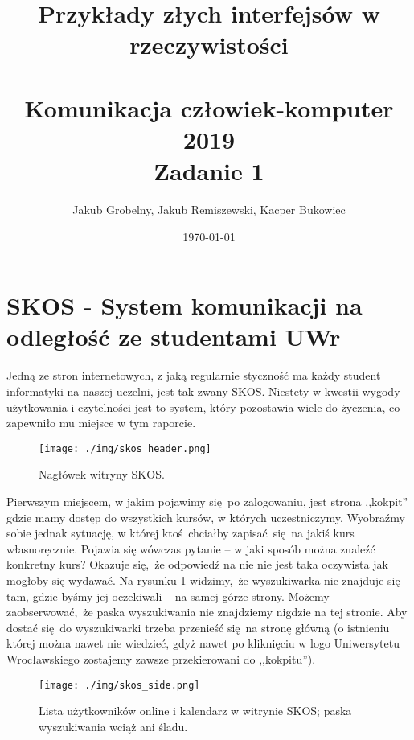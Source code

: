\documentclass[12pt, a4paper, oneside]{report}
\title{\Huge \textbf{Przykłady złych interfejsów w rzeczywistości}\\\,\\
       \Large Komunikacja człowiek-komputer 2019\\
       Zadanie 1}
\date{\today}
\author{Jakub Grobelny, Jakub Remiszewski, Kacper Bukowiec}
\begin{document}
\begin{titlepage}
    \maketitle
    \thispagestyle{empty}
\end{titlepage}

\renewcommand*\thesubsection{\arabic{section}}


\chapter*{SKOS - System komunikacji na odległość ze studentami UWr}

Jedną ze stron internetowych, z jaką regularnie styczność ma każdy student
informatyki na naszej uczelni, jest tak zwany SKOS. Niestety w kwestii wygody
użytkowania i czytelności jest to system, który pozostawia wiele do życzenia, 
co zapewniło mu miejsce w tym raporcie. \\

\begin{figure}[H]
    \centering
    \texttt{[image: ./img/skos\_header.png]}
    \caption{Nagłówek witryny SKOS.}
    \label{figure:skos-header}
\end{figure}

Pierwszym miejscem, w jakim pojawimy się po zalogowaniu, jest strona
,,kokpit'' gdzie mamy dostęp do wszystkich kursów, w których uczestniczymy.
Wyobraźmy sobie jednak sytuację, w której ktoś chciałby zapisać się na jakiś
kurs własnoręcznie. Pojawia się wówczas pytanie -- w jaki sposób można znaleźć
konkretny kurs? Okazuje się, że odpowiedź na nie nie jest taka oczywista jak
mogłoby się wydawać. Na rysunku \ref{figure:skos-header} widzimy, że 
wyszukiwarka nie znajduje się tam, gdzie byśmy jej oczekiwali -- na samej górze 
strony. Możemy zaobserwować, że paska wyszukiwania nie znajdziemy nigdzie na tej 
stronie. Aby dostać się do wyszukiwarki  trzeba przenieść się na stronę główną
(o istnieniu której można nawet nie wiedzieć, gdyż nawet po kliknięciu w logo 
Uniwersytetu Wrocławskiego zostajemy zawsze przekierowani do ,,kokpitu'').

\begin{figure}
    \centering
    \texttt{[image: ./img/skos\_side.png]}
    \caption{Lista użytkowników online i kalendarz w witrynie SKOS; paska 
             wyszukiwania wciąż ani śladu.}
    \label{figure:skos-side}
\end{figure}
\end{document}
